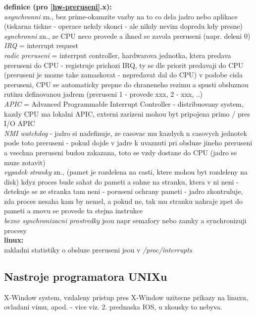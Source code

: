 \documentclass[a4paper, 11pt]{article}
\begin{document}
\noindent\textbf{definice (pro \ref{hw-preruseni}.x):} \\[0.5em]
\textit{asynchronni} zn., bez prime-okamzite vazby na to co dela jadro nebo aplikace (tiskarna tiskne - operace nekdy skonci - ale nikdy nevim dopredu kdy presne) \\[0.2em]
\textit{synchronni} zn., ze CPU neco provede a ihned se zavola preruseni (napr. deleni 0) \\[0.2em]
\textit{IRQ} = interrupt request \\[0.2em]
\textit{radic preruseni} = interrput controller, hardwarova jednotka, ktera predava preruseni do CPU - registruje prichozi IRQ, ty se dle priorit predavaji do CPU (preruseni je mozne take zamaskovat - nepredavat dal do CPU) v podobe cisla preruseni, CPU se automaticky prepne do chraneneho rezimu a spusti obsluznou rutinu definovanou jadrem (preruseni 1 - provede xxx, 2 - xxx, ..) \\[0.2em]
\textit{APIC} = Advanced Programmable Interrupt Controller - distribuovany system, kazdy CPU ma lokalni APIC, externi zarizeni mohou byt pripojena primo / pres I/O APIC \\[0.2em]
\textit{NMI watchdog} - jadro si nadefinuje, ze casovac mu kazdych n casovych jednotek posle toto preruseni - pokud dojde v jadre k uvaznuti pri obsluze jineho preruseni a vsechna preruseni budou zakazana, toto se vzdy dostane do CPU (jadro se muze zotavit) \\[0.2em]
\textit{vypadek stranky} zn., (pamet je rozdelena na casti, ktere mohou byt rozdeleny na disk) kdyz proces bude sahat do pameti a sahne na stranku, ktera v ni neni - detekuje se ze stranka tam neni - poruseni ochrany pameti - jadro zkontruluje, zda proces nesaha kam by nemel, a pokud ne, tak mu stranku nahraje zpet do pameti a znovu se provede ta stejna instrukce \\[0.2em]
\textit{bezne synchronizacni prostredky} jsou napr semafory nebo zamky a synchronizuji procesy \\[1em]

\noindent\textbf{linux:} \\[0.5em]
zakladni statistiky o obsluze preruseni jsou v \textit{/proc/interrupts}

\subsection{Nastroje programatora UNIXu}
X-Window system, vzdaleny pristup pres X-Window uzitecne prikazy na linuxu, ovladani vimu, apod. - vice viz. 2. prednaska IOS, u zkousky to nebyva.
\end{document}
